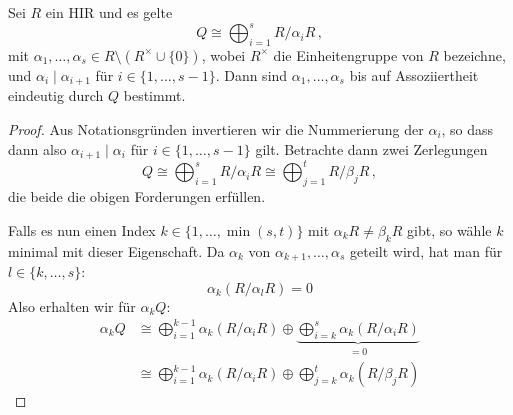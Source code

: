 \begin{thLemma}
    Sei $R$ ein HIR und es gelte
    \[ Q \cong \bigoplus_{i=1}^s R/\alpha_i R \,, \]
    mit $\alpha_1,\ldots,\alpha_s \in R\setminus (R^\times\cup\{0\})$, wobei
    $R^\times$ die Einheitengruppe von $R$ bezeichne, und
    $\alpha_i\mid\alpha_{i+1}$ für $i\in\{1,\ldots,s-1\}$.
    Dann sind $\alpha_1,\ldots,\alpha_s$ bis auf Assoziiertheit eindeutig durch
    $Q$ bestimmt.
\end{thLemma}

\begin{proof}
    Aus Notationsgründen invertieren wir die Nummerierung der $\alpha_i$,
    so dass dann also $\alpha_{i+1} \mid \alpha_i$ für $i\in\{1,\ldots,s-1\}$
    gilt. Betrachte dann zwei Zerlegungen
    \[ Q \cong 
        \bigoplus_{i=1}^s R/\alpha_i R \cong \bigoplus_{j=1}^t R/\beta_j R \,,\]
    die beide die obigen Forderungen erfüllen.
    
    Falls es nun einen Index $k\in\{1,\ldots,\min(s,t)\}$ mit
    $\alpha_k R \neq \beta_k R$ gibt, so wähle $k$ minimal mit dieser
    Eigenschaft. Da $\alpha_k$ von $\alpha_{k+1},\ldots,\alpha_s$ geteilt wird,
    hat man für $l\in\{k,\ldots,s\}$:
    \[ \alpha_k (R/\alpha_l R) = 0 \]
    Also erhalten wir für $\alpha_k Q$:
    \begin{align*}
        \alpha_k Q 
        &\cong      \bigoplus_{i=1}^{k-1} \alpha_k (R/\alpha_i R) \oplus
        \underbrace{\bigoplus_{i=k}^{s}   \alpha_k (R/\alpha_i R)}_{= 0}  \\
        &\cong \bigoplus_{i=1}^{k-1} \alpha_k (R/\alpha_i R) \oplus
               \bigoplus_{j=k}^{t}   \alpha_k (R/\beta_j R)
    \end{align*}
    

\end{proof}
